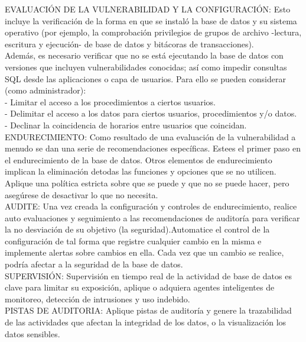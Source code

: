 EVALUACIÓN DE LA VULNERABILIDAD Y LA CONFIGURACIÓN:
Esto incluye la verificación de la forma en que se instaló la base de datos y su sistema operativo (por ejemplo, la comprobación privilegios de grupos de archivo -lectura, escritura y ejecución- de base de datos y bitácoras de transacciones). \\

Además, es necesario verificar que no se está ejecutando la base de datos con versiones que incluyen vulnerabilidades conocidas; así como impedir consultas SQL desde las aplicaciones o capa de usuarios. Para ello se pueden considerar (como administrador):\\
- Limitar el acceso a los procedimientos a ciertos usuarios.\\
- Delimitar el acceso a los datos para ciertos usuarios, procedimientos y/o datos.\\
- Declinar la coincidencia de horarios entre usuarios que coincidan. \\

ENDURECIMIENTO: 
Como resultado de una evaluación de la vulnerabilidad a menudo se dan una serie de recomendaciones específicas. Estees el primer paso en el endurecimiento de la base de datos. Otros elementos de endurecimiento implican la eliminación detodas las funciones y opciones que se no utilicen. Aplique una política estricta sobre que se puede y que no se puede hacer, pero asegúrese de desactivar lo que no necesita. \\

AUDITE: 
Una vez creada la configuración y controles de endurecimiento, realice auto evaluaciones y seguimiento a las recomendaciones de auditoría para verificar la no desviación de su objetivo (la seguridad).Automatice el control de la configuración de tal forma que registre cualquier cambio en la misma e implemente alertas sobre cambios en ella. Cada vez que un cambio se realice, podría afectar a la seguridad de la base de datos.\\

SUPERVISIÓN:
Supervisión en tiempo real de la actividad de base de datos es clave para limitar su exposición, aplique o adquiera agentes inteligentes de monitoreo, detección de intrusiones y uso indebido.\\

PISTAS DE AUDITORIA:
Aplique pistas de auditoría y genere la trazabilidad de las actividades que afectan la integridad de los datos, o la visualización los datos sensibles. 








